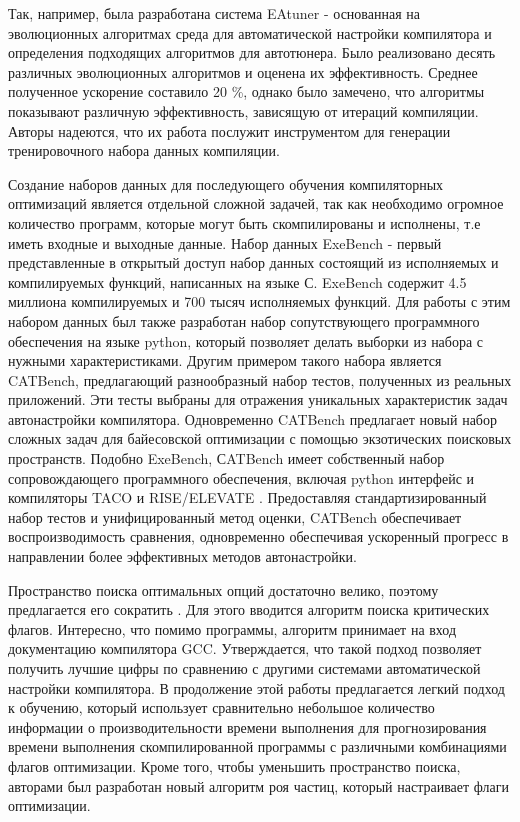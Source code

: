 Так, например, была разработана система EAtuner \cite{xiao2024eatuner} -  основанная на эволюционных алгоритмах среда для автоматической настройки компилятора и определения подходящих алгоритмов для автотюнера. Было реализовано десять различных эволюционных алгоритмов и оценена их эффективность. Среднее полученное ускорение составило 20 \%, однако было замечено, что алгоритмы показывают различную эффективность, зависящую от итераций компиляции. Авторы надеются, что их работа послужит инструментом для генерации тренировочного набора данных компиляции. 

Создание наборов данных для последующего обучения компиляторных оптимизаций является отдельной сложной задачей, так как необходимо огромное количество программ, которые могут быть скомпилированы и исполнены, т.е иметь входные и выходные данные. Набор данных ExeBench \cite{armengol2022exebench}  - первый представленные в открытый доступ набор данных состоящий из исполняемых и компилируемых функций, написанных на языке С. ExeBench содержит 4.5 миллиона компилируемых и 700 тысяч исполняемых функций. Для работы с этим набором данных был также разработан набор сопутствующего программного обеспечения на языке python, который позволяет делать выборки из набора с нужными характеристиками. Другим примером такого набора является CATBench, предлагающий разнообразный набор тестов, полученных из реальных приложений.
Эти тесты выбраны для отражения уникальных характеристик задач автонастройки компилятора.
Одновременно CATBench предлагает новый набор сложных задач для байесовской оптимизации с помощью
экзотических поисковых пространств. Подобно ExeBench, СATBench имеет собственный набор сопровождающего программного обеспечения, включая python интерфейс и компиляторы TACO \cite{kjolstad2017taco} и RISE/ELEVATE \cite{steuwer2022rise}.
Предоставляя стандартизированный набор тестов и унифицированный метод оценки, CATBench обеспечивает воспроизводимость сравнения, одновременно обеспечивая ускоренный прогресс в направлении более эффективных методов автонастройки.

Пространство поиска оптимальных опций достаточно велико, поэтому предлагается его сократить \cite{zhu2023compiler}. Для этого вводится алгоритм поиска критических флагов. Интересно, что помимо программы, алгоритм принимает на вход документацию компилятора GCC. Утверждается, что такой подход позволяет получить лучшие цифры по сравнению с другими системами автоматической настройки компилятора.  В продолжение этой работы \cite{zhu2024compiler} предлагается легкий подход к обучению, который использует сравнительно небольшое количество информации о производительности времени выполнения для прогнозирования времени выполнения скомпилированной программы с различными комбинациями флагов оптимизации. Кроме того, чтобы уменьшить пространство поиска, авторами был разработан новый алгоритм роя частиц, который настраивает флаги оптимизации.


